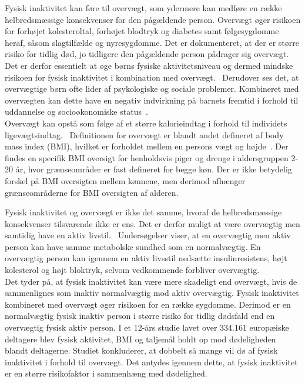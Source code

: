 Fysisk inaktivitet kan føre til overvægt, som ydermere kan medføre en række helbredsmæssige konsekvenser for den pågældende person. Overvægt øger risikoen for forhøjet kolesteroltal, forhøjet blodtryk og diabetes samt følgesygdomme heraf, såsom slagtilfælde og nyresygdomme. Det er dokumenteret, at der er større risiko for tidlig død, jo tidligere den pågældende person pådrager sig overvægt. Det er derfor essentielt at øge børns fysiske aktivitetsniveau og dermed mindske risikoen for fysisk inaktivitet i kombination med overvægt.~\citep{Nestle2014} Derudover ses det, at overvægtige børn ofte lider af psykologiske og sociale problemer. Kombineret med overvægten kan dette have en negativ indvirkning på barnets fremtid i forhold til uddannelse og socioøkonomiske status~\citep{Academic2016}. \\
Overvægt kan opstå som følge af et større kalorieindtag i forhold til individets ligevægtsindtag.~\citep{Nestle2014} Definitionen for overvægt er blandt andet defineret af body mass index (BMI), hvilket er forholdet mellem en persons vægt og højde~\citep{Academic2016}. Der findes en specifik BMI oversigt for henholdsvis piger og drenge i aldersgruppen 2-20 år, hvor grænseområder er fast defineret for begge køn. Der er ikke betydelig forskel på BMI oversigten mellem kønnene, men derimod afhænger grænseområderne for BMI oversigten af alderen.~\citep{DiseaseControl2015}

Fysisk inaktivitet og overvægt er ikke det samme, hvoraf de helbredsmæssige konsekvenser tilsvarende ikke er ens. Det er derfor muligt at være overvægtig men samtidig have en aktiv livstil.~\citep{Kiens2007} Undersøgelser viser, at en overvægtig men aktiv person kan have samme metabolske sundhed som en normalvægtig. En overvægtig person kan igennem en aktiv livsstil nedsætte insulinresistens, højt kolesterol og højt bloktryk, selvom vedkommende forbliver overvægtig.~\citep{Lunau2012,Marcelino2012} \\
Det tyder på, at fysisk inaktivitet kan være mere skadeligt end overvægt, hvis de sammenlignes som inaktiv normalvægtig mod aktiv overvægtig. Fysisk inaktivitet kombineret med overvægt øger risikoen for en række sygdomme. Derimod er en normalvægtig fysisk inaktiv person i større risiko for tidlig dødsfald end en overvægtig fysisk aktiv person. I et 12-års studie lavet over 334.161 europæiske deltagere blev fysisk aktivitet, BMI og taljemål holdt op mod dødeligheden blandt deltagerne. Studiet konkluderer, at dobbelt så mange vil dø af fysisk inaktivitet i forhold til overvægt. Det antydes igennem dette, at fysisk inaktivitet er en større risikofaktor i sammenhæng med dødelighed.~\citep{Ekelund2015} 